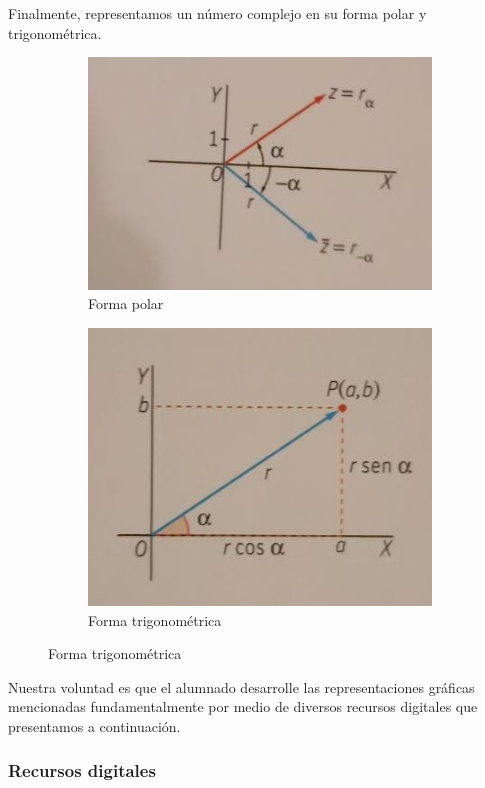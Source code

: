 \documentclass[../main.tex]{memoir}
\begin{document}
Finalmente, representamos un número complejo en su forma polar y trigonométrica.

\begin{figure}[H]
	\centering
	\begin{subfigure}{0.48\textwidth}
		\centering
		\includegraphics[width=\linewidth]{images/polar.jpg}
		\caption{Forma polar}
	\end{subfigure}
	\begin{subfigure}{0.48\textwidth}
		\centering
		\includegraphics[scale=0.39]{images/trigonometrica.jpg}
		\caption{Forma trigonométrica}
	\end{subfigure}
	\label{fig:representacion3}
\end{figure}

Nuestra voluntad es que el alumnado desarrolle las representaciones gráficas mencionadas fundamentalmente por medio de diversos recursos digitales que presentamos a continuación.
\subsubsection{Recursos digitales}
\end{document}
